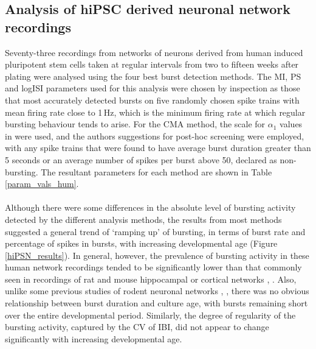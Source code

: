 \documentclass[12pt, titlepage]{article}
\begin{document}
\subsection*{Analysis of hiPSC derived neuronal network recordings}
 Seventy-three recordings from networks of neurons derived from human induced pluripotent stem cells taken at regular intervals from two to fifteen weeks after plating were analysed using the four best burst detection methods. The MI, PS and logISI parameters used for this analysis were chosen by inspection as those that most accurately detected bursts on five randomly chosen spike trains with mean firing rate close to 1$\,$Hz, which is the minimum firing rate at which regular bursting behaviour tends to arise.  For the CMA method, the scale for $\alpha_1$ values in \cite{Kapucu2012} were used, and the authors suggestions for post-hoc screening were employed, with any spike trains that were found to have average burst duration greater than 5 seconds or an average number of spikes per burst above 50, declared as non-bursting.  The resultant parameters for each method are shown in Table \ref{param_vals_hum}.
\\ \\ Although there were some differences in the absolute level of bursting activity detected by the different analysis methods, the results from most methods suggested a general trend of `ramping up' of bursting, in terms of burst rate and percentage of spikes in bursts, with increasing developmental age (Figure \ref{hiPSN_results}). In general, however, the prevalence of bursting activity in these human network recordings tended to be significantly lower than that commonly seen in recordings of rat and mouse hippocampal or cortical networks \cite{Charlesworth2015}, \cite{Chiappalone2005}.
 Also, unlike some previous studies of rodent neuronal networks \cite{Charlesworth2015}, \cite{Demas2003}, there was no obvious relationship between burst duration and culture age, with bursts remaining short over the entire developmental period. Similarly, the degree of regularity of the bursting activity, captured by the CV of IBI, did not appear to change significantly with increasing developmental age.
\end{document}
